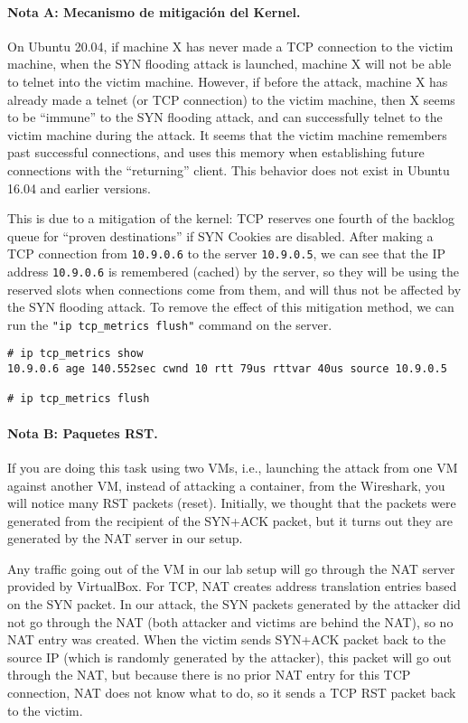 \paragraph{Nota A: Mecanismo de mitigación del Kernel.} On Ubuntu 20.04, if machine X
has never made a TCP connection to the victim machine, when the SYN flooding 
attack is launched, machine X will not be able to telnet into the 
victim machine. However, if before the attack, machine X
has already made a telnet (or TCP connection) to the victim machine, then X 
seems to be ``immune'' to the SYN flooding attack, and can
successfully telnet to the victim machine during the attack. 
It seems that the victim machine remembers past successful 
connections, and uses this memory when establishing
future connections with the ``returning'' client. 
This behavior does not exist in Ubuntu 16.04 and earlier versions.

This is due to a mitigation of the kernel: 
TCP reserves one fourth of the backlog queue for ``proven destinations'' 
if SYN Cookies are disabled. After making a TCP connection
from \texttt{10.9.0.6} to the server \texttt{10.9.0.5}, we can 
see that the IP address \texttt{10.9.0.6} is remembered (cached)
by the server, so they will be using the reserved slots
when connections come from them, and will thus not be 
affected by the SYN flooding attack.
To remove the effect of this mitigation method, we can 
run the \texttt{"ip tcp\_metrics flush"} command on
the server. 

\begin{lstlisting}
# ip tcp_metrics show
10.9.0.6 age 140.552sec cwnd 10 rtt 79us rttvar 40us source 10.9.0.5

# ip tcp_metrics flush
\end{lstlisting}


\paragraph{Nota B: Paquetes RST.} 
If you are doing this task using two VMs, i.e., launching the attack from one VM
against another VM, instead of attacking a container, from the Wireshark,
you will notice many RST packets (reset). Initially, we thought that 
the packets were generated from the recipient of the SYN+ACK packet, 
but it turns out they are generated by the 
NAT server in our setup. 

Any traffic going out of the VM in our lab setup will go through the NAT server
provided by VirtualBox. For TCP, NAT creates address translation 
entries based on the SYN packet. 
In our attack, the SYN packets generated 
by the attacker did not go through the NAT (both attacker and victims are behind the 
NAT), so no NAT entry was created. When the victim sends SYN+ACK packet back to the
source IP (which is randomly generated by the attacker), this packet will 
go out through the NAT, but because there is no prior NAT entry
for this TCP connection, NAT does not know what to do,
so it sends a TCP RST packet back to the victim. 

